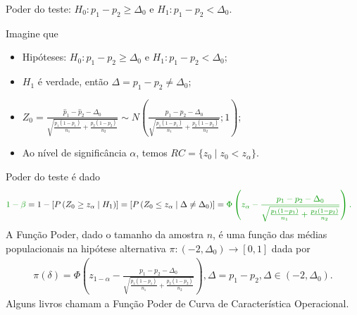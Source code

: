 \documentclass[9pt]{beamer}
\begin{document}
\begin{frame}{Poder do teste: $H_0:p_1 - p_2 \geq \Delta_0$ e $H_1: p_1 - p_2 < \Delta_0$.}

\footnotesize

Imagine que
\begin{itemize}
	\item Hipóteses: $H_0: p_1 - p_2 \geq \Delta_0$ e $H_1: p_1 -  p_2 < \Delta_0$;
	\item $H_1$ é verdade, então $\Delta = p_1-p_2 \neq \Delta_0$;
	\item $Z_0 = \frac{\hat{p}_1 - \hat{p}_2 - \Delta_0}{\sqrt{ 
			\frac{p_1(1-p_1)}{n_1} + \frac{p_2(1-p_2)}{n_2} }} \sim N\left( \frac{p_1 - p_2 - \Delta_0}{\sqrt{\frac{p_1(1-p_1)}{n_1} + \frac{p_2(1-p_2)}{n_2}}};1 \right)$;
	\item Ao nível de significância $\alpha$, temos $RC = \{ z_0 \mid z_0 < z_{\alpha}  \}$.
\end{itemize}
\vfill	

Poder do teste é dado
\begin{align*}
\textcolor{important}{1-\beta} &=1 - \left[P\left(  Z_0 \geq z_{\alpha} \mid H_1 \right)\right] = \left[P\left( Z_0 \leq z_{\alpha} \mid \Delta \neq \Delta_0 \right)\right]= \textcolor{important}{\Phi\left( z_{\alpha} - \frac{p_1-p_2 - \Delta_0}{\sqrt{\frac{p_1(1-p_1)}{n_1} + \frac{p_2(1-p_2)}{n_2}}} \right).}
\end{align*}
A \textcolor{important}{Função Poder}, dado o tamanho da amostra $n$, é uma função das médias populacionais na hipótese alternativa  $\pi: (-2, \Delta_0) \longrightarrow [0,1]$ dada por
\begin{align*}
\pi(\delta) = \Phi\left( z_{1-\alpha} - \frac{p_1-p_2 - \Delta_0}{\sqrt{\frac{p_1(1-p_1)}{n_1} + \frac{p_2(1-p_2)}{n_2}}} \right), \Delta = p_1 - p_2, \Delta \in (-2, \Delta_0).
\end{align*}
Alguns livros chamam a Função Poder de \textcolor{important}{Curva de Característica Operacional.}

\normalsize

\end{frame}
\end{document}

